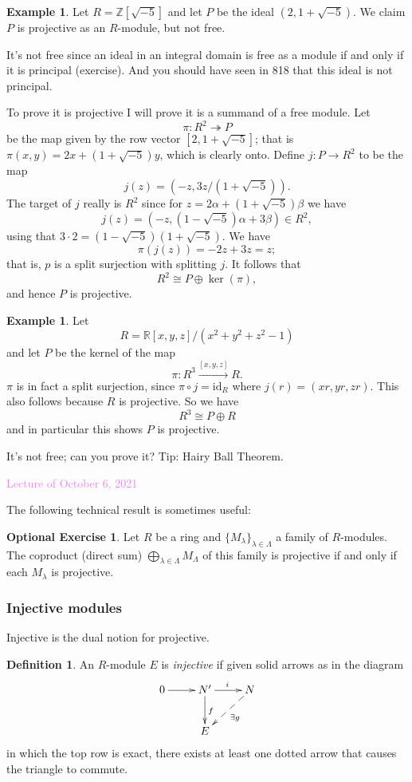 \documentclass{amsart}[12pt]
\def\ker{\operatorname{ker}}
\newcommand{\onto}{\twoheadrightarrow}
\newcommand{\id}{\mathrm{id}}
\newcommand{\Oct}[1]{\textcolor{violet}{Lecture of October #1, 2021}}
\newcommand{\R}{{\mathbb{R}}}
\newcommand{\Z}{\mathbb{Z}}
\newcommand{\DEF}[1]{\emph{#1}\index{#1}}
\numberwithin{equation}{section}
\theoremstyle{plain} %
\theoremstyle{definition}
\newtheorem{defn}[equation]{Definition}
\newtheorem{ex}[equation]{Example}
\newtheorem{exer}[equation]{Optional Exercise}
\theoremstyle{remark}
\newcommand{\sssec}[1]{\subsubsection{#1}}
\newcommand{\xra}[1]{\xrightarrow{#1}}
\begin{document}
\begin{ex} Let $R = \Z[\sqrt{-5}]$ and let $P$ be the ideal $(2, 1 + \sqrt{-5})$. We claim $P$ is projective as an $R$-module, but not free.

It's not free since an ideal in an integral domain is free as a module if and only if it is principal (exercise). And you should have seen in 818 that this ideal is not principal.

To prove it is projective I will prove it is a summand of a free module. Let
$$
\pi: R^2 \onto P
$$
be the map given by the row vector $[2, 1 + \sqrt{-5}]$; that is
$\pi(x,y) = 2x + (1+\sqrt{-5})y$, which is clearly onto. Define $j: P \to R^2$ to be the map
$$
j(z) = (-z, 3z/(1 + \sqrt{-5})).
$$
The target of $j$ really is $R^2$ since for $z = 2 \alpha + (1+\sqrt{-5}) \beta$
we have
$$
j(z) = (-z, (1-\sqrt{-5})\alpha + 3\beta) \in R^2,
$$
using that $3 \cdot 2 = (1-\sqrt{-5}) (1+\sqrt{-5})$. We have
$$
\pi(j(z)) = -2z + 3z = z;
$$
that is, $p$ is a split surjection with splitting $j$. It follows that 
$$
R^2 \cong P \oplus \ker(\pi),
$$
and hence $P$ is projective. 
\end{ex}

\begin{ex}
\label{ex:hairyball}
Let
$$
R = \R[x,y,z]/(x^2 + y^2 + z^2 -1)
$$
and let $P$ be the kernel of the map
$$
\pi: R^3 \xra{[x,y,z]} R.
$$
$\pi$ is in fact a split surjection, since $\pi \circ j = \id_R$ where $j(r) = (xr, yr, zr)$. This also follows because $R$ is projective. 
So we have
$$
R^3 \cong P \oplus R
$$
and in particular this shows $P$ is projective. 

It's not free; can you prove it? Tip: Hairy Ball Theorem.
\end{ex}

\Oct{6}


The following technical result is sometimes useful:

\begin{exer} Let $R$ be a ring and  $\{M_\lambda\}_{\lambda \in \Lambda}$ a family of $R$-modules.  The coproduct (direct sum) $\bigoplus_{\lambda \in \Lambda} M_\Lambda$ of this family is projective if and only if each $M_\lambda$ is projective. 
\end{exer}

\sssec{Injective modules}

Injective is the dual notion for projective.

\begin{defn} An $R$-module $E$ is \DEF{injective} if given solid arrows as in the diagram
$$
\xymatrix{
0 \ar[r] & N' \ar[d]^f \ar[r]^i & N \ar@{-->}[dl]^{\exists g} \\ 
& E \\
}
$$
in which the top row is exact, there exists at least one dotted arrow that causes the triangle to commute.
\end{defn}
\end{document}
